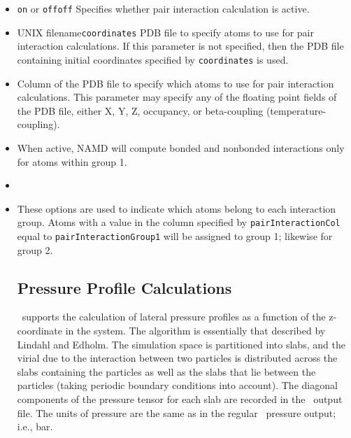 \begin{itemize}

\item
{}
{{\tt on} or {\tt off}}{{\tt off}}
{Specifies whether pair interaction calculation is active.}

\item
{}
{UNIX filename}{{\tt coordinates}}
{PDB file to specify atoms to use for pair interaction calculations.  If 
this parameter is not specified, then the PDB file containing initial 
coordinates specified by {\tt coordinates} is used.}

\item
{}
{
Column of the PDB file to specify which atoms to use for pair interaction
calculations.  This parameter may specify any of the floating point
fields of the PDB file, either X, Y, Z, occupancy, or beta-coupling
(temperature-coupling).  
}

\item
{}
{
When active, NAMD will compute bonded and nonbonded interactions only for atoms 
within group 1.  
}
 
\item
{}

\item
{}
{
These options are used to indicate which atoms belong to each interaction 
group.  Atoms with a value in the column specified by {\tt pairInteractionCol} 
equal to {\tt pairInteractionGroup1} will be assigned to group 1; likewise
for group 2.
}

\subsection{Pressure Profile Calculations}
\NAMD\ supports the calculation of lateral pressure profiles as a function of
the z-coordinate in the system.  The algorithm is essentially that described
by Lindahl and Edholm.  The simulation space is partitioned into slabs, and
the virial due to the interaction between two particles is distributed across 
the slabs containing the particles as well as the slabs that lie between the
particles (taking periodic boundary conditions into account).  The diagonal
components of the pressure tensor for each slab are recorded in the 
\NAMD\ output file.  The units of pressure are the same as in the regular 
\NAMD\ pressure output; i.e., bar.


\end{itemize}
